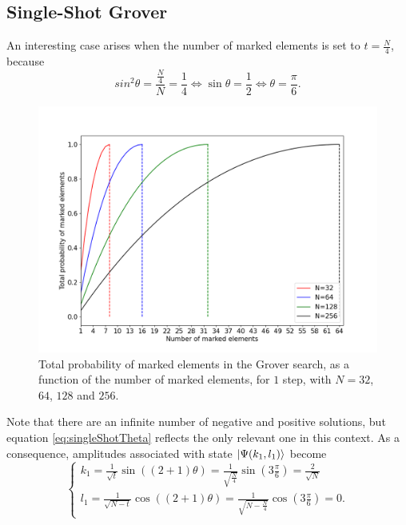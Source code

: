 \documentclass[../../dissertation.tex]{subfiles}
\begin{document}
\subsection{Single-Shot Grover}
An interesting case arises when the number of marked elements is set to $t=\frac{N}{4}$, because 
\begin{equation}
	sin^2\theta = \frac{\frac{N}{4}}{N} = \frac{1}{4} \iff \sin\theta = \frac{1}{2} \iff \theta = \frac{\pi}{6}. 
	\label{eq:singleShotTheta}
\end{equation}
\begin{figure}[h]
	\centering
	\includegraphics[scale=0.40]{img/Grover/GroverSingleShot3264128256}
	\caption{Total probability of marked elements in the Grover search, as a function of the number of marked elements, for $1$ step, with $N=32$, $64$, $128$ and $256$.} 
	\label{GroverSingleShot3264128256}
\end{figure}
Note that there are an infinite number of negative and positive solutions, but
equation \ref{eq:singleShotTheta} reflects the only relevant one in this
context. As a consequence, amplitudes associated with state
$\ket{\Psi(k_1,l_1)}$ become 
\begin{equation}
	\begin{cases}
		k_{1} = \frac{1}{\sqrt{t}} \sin{((2+1)\theta)} = \frac{1}{\sqrt{\frac{N}{4}}} \sin{(3\frac{\pi}{6})} = \frac{2}{\sqrt{N}}
		\\l_{1} = \frac{1}{\sqrt{N-t}}\cos{((2+1)\theta)} = \frac{1}{\sqrt{N-\frac{N}{4}}}\cos{(3\frac{\pi}{6})} = 0.
	\end{cases}\label{eq:groverSingleShotKandJ}
\end{equation}
\end{document}
